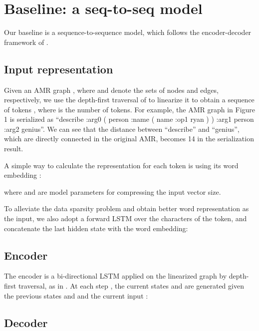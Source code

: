 \documentclass[11pt,a4paper]{article}
\begin{document}
\section{Baseline: a seq-to-seq model}
\label{sec:base}

Our baseline is a sequence-to-sequence model, which follows the encoder-decoder framework of .

\subsection{Input representation}
\label{sec:base_inp}

Given an AMR graph , where  and  denote the sets of nodes and edges, respectively, we use the depth-first traversal of  to linearize it to obtain a sequence of tokens , where  is the number of tokens.
For example, the AMR graph in Figure 1 is serialized as ``describe :arg0 ( person :name ( name :op1 ryan )  )  :arg1 person :arg2 genius''.
We can see that the distance between ``describe'' and ``genius'', which are directly connected in the original AMR,  becomes 14 in the serialization result.


A simple way to calculate the representation for each token  is using its word embedding :

where  and  are model parameters for compressing the input vector size.


To alleviate the data sparsity problem and obtain better word representation as the input, we also adopt a forward LSTM over the characters of the token, and concatenate the last hidden state  with the word embedding:
 


\subsection{Encoder}
\label{sec:base_enc}

The encoder is a bi-directional LSTM applied on the linearized graph by depth-first traversal, as in .
At each step , the current states  and  are generated given the previous states  and  and the current input :



\subsection{Decoder}
\label{sec:base_dec}
\end{document}
